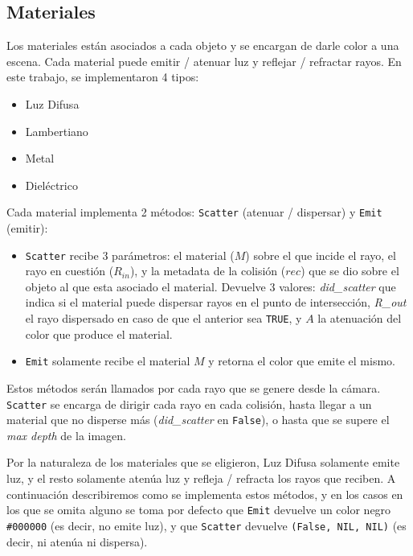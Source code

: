 \subsection{Materiales}

Los materiales están asociados a cada objeto y se encargan de darle color a una
escena. Cada material puede emitir / atenuar luz y reflejar / refractar
rayos. En este trabajo, se implementaron 4 tipos:

\begin{itemize}
    \item Luz Difusa
    \item Lambertiano
    \item Metal
    \item Dieléctrico
\end{itemize}

Cada material implementa 2 métodos: \texttt{Scatter} (atenuar / dispersar) y
\texttt{Emit} (emitir):

\begin{itemize}
    \item \texttt{Scatter} recibe 3 parámetros: el material ($M$) sobre el que
        incide el rayo, el rayo en cuestión ($R_{in}$), y la metadata de la
        colisión ($rec$) que se dio sobre el objeto al que esta asociado el
        material. Devuelve 3 valores: \textit{did\_scatter} que indica si el
        material puede dispersar rayos en el punto de intersección,
        \textit{R\_{out}} el rayo dispersado en caso de que el anterior sea
        \texttt{TRUE}, y $A$ la atenuación del color que produce el material.
    \item \texttt{Emit} solamente recibe el material $M$ y retorna el color que
        emite el mismo.
\end{itemize}

Estos métodos serán llamados por cada rayo que se genere desde la cámara.
\texttt{Scatter} se encarga de dirigir cada rayo en cada colisión, hasta llegar
a un material que no disperse más (\textit{did\_scatter} en \texttt{False}), o
hasta que se supere el \textit{max depth} de la imagen.

Por la naturaleza de los materiales que se eligieron, Luz Difusa solamente emite
luz, y el resto solamente atenúa luz  y refleja / refracta los rayos que
reciben. A continuación describiremos como se implementa estos métodos, y en los
casos en los que se omita alguno se toma por defecto que \texttt{Emit} devuelve
un color negro \texttt{\#000000} (es decir, no emite luz), y que
\texttt{Scatter} devuelve \texttt{(False, NIL, NIL)} (es decir, ni atenúa ni
dispersa).

